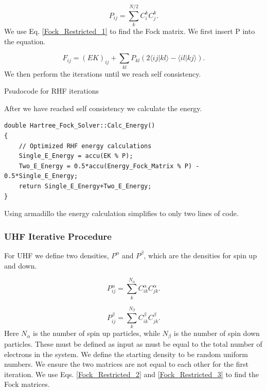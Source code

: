 \documentclass[a4paper,norsk,11pt,twoside]{report}
\begin{document}
\begin{equation}
P_{ij} = \sum_k^{N/2} C_i^k C_j^k .
\end{equation}
We use Eq. \eqref{Fock_Restricted_1} to find the Fock matrix. We first insert P into the equation.

\begin{equation}
F_{ij} = (EK)_{ij} + \sum_{kl} P_{kl} (2 \langle i j | k l \rangle - \langle i l | k j \rangle) .
\end{equation}
We then perform the iterations until we reach self consistency. \\

\begin{algorithm}[H]
 \caption{Psudocode for RHF iterations}
 \label{RHF_ITERATIVE_PROCEDURE}
\end{algorithm}
After we have reached self consistency we calculate the energy.

\begin{lstlisting}
double Hartree_Fock_Solver::Calc_Energy()
{
    // Optimized RHF energy calculations
    Single_E_Energy = accu(EK % P);
    Two_E_Energy = 0.5*accu(Energy_Fock_Matrix % P) - 0.5*Single_E_Energy;
    return Single_E_Energy+Two_E_Energy;
}
\end{lstlisting}
Using armadillo the energy calculation simplifies to only two lines of code. 

\subsubsection{UHF Iterative Procedure}
For UHF we define two densities, $P^{\alpha}$ and $P^{\beta}$, which are the densities for spin up and down. 

\begin{equation}
P^{\alpha}_{ij} = \sum_k^{N_{\alpha}} C^{\alpha}_{ik} C^{\alpha}_{jk} .
\end{equation}

\begin{equation}
P^{\beta}_{ij} = \sum_k^{N_{\beta}} C^{\beta}_{ik} C^{\beta}_{jk} .
\end{equation}
Here $N_{\alpha}$ is the number of spin up particles, while $N_{\beta}$ is the number of spin down particles. These must be defined as input as must be equal to the total number of electrons in the system. We define the starting density to be random uniform numbers. We ensure the two matrices are not equal to each other for the first iteration. We use Eqs. \eqref{Fock_Restricted_2} and \eqref{Fock_Restricted_3} to find the Fock matrices. \\
\end{document}
